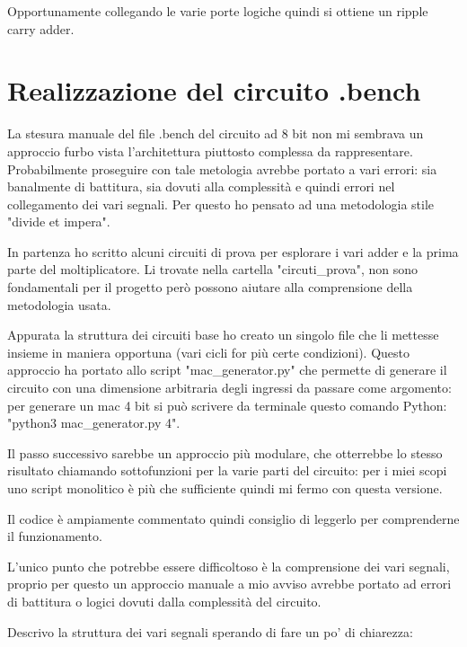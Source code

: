 \documentclass[12pt, letterpaper]{article}
\begin{document}
Opportunamente collegando le varie porte logiche quindi si ottiene un ripple carry adder.  

\section{Realizzazione del circuito .bench}

La stesura manuale del file .bench del circuito ad 8 bit non mi sembrava un approccio furbo vista l'architettura piuttosto complessa da rappresentare. Probabilmente proseguire con tale metologia avrebbe portato a vari errori: sia banalmente di battitura, sia dovuti alla complessità e quindi errori nel collegamento dei vari segnali. Per questo ho pensato ad una metodologia stile "divide et impera".

In partenza ho scritto alcuni circuiti di prova per esplorare i vari adder e la prima parte del moltiplicatore.
Li trovate nella cartella "circuti\_prova", non sono fondamentali per il progetto però possono aiutare alla comprensione della metodologia usata.

Appurata la struttura dei circuiti base ho creato un singolo file che li mettesse insieme in maniera opportuna (vari cicli for più certe condizioni).
Questo approccio ha portato allo script "mac\_generator.py" che permette di generare il circuito con una dimensione arbitraria degli ingressi da passare come argomento: per generare un mac 4 bit si può scrivere da terminale questo comando Python: "python3 mac\_generator.py 4".  

Il passo successivo sarebbe un approccio più modulare, che otterrebbe lo stesso risultato chiamando sottofunzioni per la varie parti del circuito: per i miei scopi uno script monolitico è più che sufficiente quindi mi fermo con questa versione.

Il codice è ampiamente commentato quindi consiglio di leggerlo per comprenderne il funzionamento.

L'unico punto che potrebbe essere difficoltoso è la comprensione dei vari segnali, proprio per questo un approccio manuale a mio avviso avrebbe portato ad errori di battitura o logici dovuti dalla complessità del circuito.

Descrivo la struttura dei vari segnali sperando di fare un po' di chiarezza:
\end{document}
